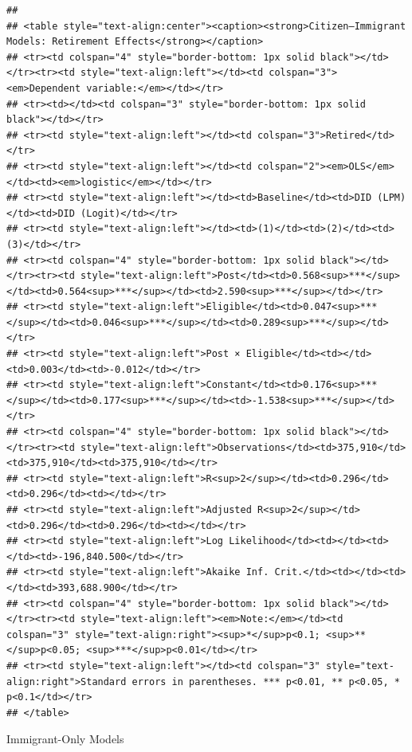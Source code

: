\documentclass[
]{article}
\begin{document}
\begin{verbatim}
## 
## <table style="text-align:center"><caption><strong>Citizen–Immigrant Models: Retirement Effects</strong></caption>
## <tr><td colspan="4" style="border-bottom: 1px solid black"></td></tr><tr><td style="text-align:left"></td><td colspan="3"><em>Dependent variable:</em></td></tr>
## <tr><td></td><td colspan="3" style="border-bottom: 1px solid black"></td></tr>
## <tr><td style="text-align:left"></td><td colspan="3">Retired</td></tr>
## <tr><td style="text-align:left"></td><td colspan="2"><em>OLS</em></td><td><em>logistic</em></td></tr>
## <tr><td style="text-align:left"></td><td>Baseline</td><td>DID (LPM)</td><td>DID (Logit)</td></tr>
## <tr><td style="text-align:left"></td><td>(1)</td><td>(2)</td><td>(3)</td></tr>
## <tr><td colspan="4" style="border-bottom: 1px solid black"></td></tr><tr><td style="text-align:left">Post</td><td>0.568<sup>***</sup></td><td>0.564<sup>***</sup></td><td>2.590<sup>***</sup></td></tr>
## <tr><td style="text-align:left">Eligible</td><td>0.047<sup>***</sup></td><td>0.046<sup>***</sup></td><td>0.289<sup>***</sup></td></tr>
## <tr><td style="text-align:left">Post × Eligible</td><td></td><td>0.003</td><td>-0.012</td></tr>
## <tr><td style="text-align:left">Constant</td><td>0.176<sup>***</sup></td><td>0.177<sup>***</sup></td><td>-1.538<sup>***</sup></td></tr>
## <tr><td colspan="4" style="border-bottom: 1px solid black"></td></tr><tr><td style="text-align:left">Observations</td><td>375,910</td><td>375,910</td><td>375,910</td></tr>
## <tr><td style="text-align:left">R<sup>2</sup></td><td>0.296</td><td>0.296</td><td></td></tr>
## <tr><td style="text-align:left">Adjusted R<sup>2</sup></td><td>0.296</td><td>0.296</td><td></td></tr>
## <tr><td style="text-align:left">Log Likelihood</td><td></td><td></td><td>-196,840.500</td></tr>
## <tr><td style="text-align:left">Akaike Inf. Crit.</td><td></td><td></td><td>393,688.900</td></tr>
## <tr><td colspan="4" style="border-bottom: 1px solid black"></td></tr><tr><td style="text-align:left"><em>Note:</em></td><td colspan="3" style="text-align:right"><sup>*</sup>p<0.1; <sup>**</sup>p<0.05; <sup>***</sup>p<0.01</td></tr>
## <tr><td style="text-align:left"></td><td colspan="3" style="text-align:right">Standard errors in parentheses. *** p<0.01, ** p<0.05, * p<0.1</td></tr>
## </table>
\end{verbatim}

Immigrant-Only Models
\end{document}
